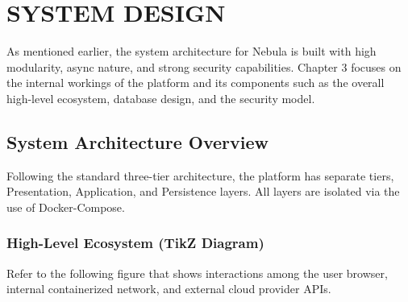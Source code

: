 \chapter{SYSTEM DESIGN}

As mentioned earlier, the system architecture for Nebula is built with high modularity, async nature, and strong security capabilities. Chapter 3 focuses on the internal workings of the platform and its components such as the overall high-level ecosystem, database design, and the security model.

\section{System Architecture Overview}
Following the standard three-tier architecture, the platform has separate tiers, Presentation, Application, and Persistence layers. All layers are isolated via the use of Docker-Compose.

\subsection{High-Level Ecosystem (TikZ Diagram)}
Refer to the following figure that shows interactions among the user browser, internal containerized network, and external cloud provider APIs.

